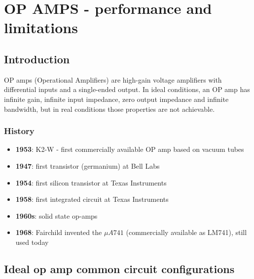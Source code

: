 \section{OP AMPS - performance and limitations}
\subsection{Introduction}
OP amps (Operational Amplifiers) are high-gain voltage amplifiers with differential inputs and a single-ended output. In ideal
conditions, an OP amp has infinite gain, infinite input impedance, zero output impedance and infinite bandwidth, but in real
conditions those properties are not achievable.

\subsubsection*{History}
\begin{itemize}
	\item \textbf{1953}: K2-W - first commercially available OP amp based on vacuum tubes
	\item \textbf{1947}: first transistor (germanium) at Bell Labs
	\item \textbf{1954}: first silicon transistor at Texas Instruments
	\item \textbf{1958}: first integrated circuit at Texas Instruments
	\item \textbf{1960s}: solid state op-amps
	\item \textbf{1968}: Fairchild invented the \(\mu{A741}\) (commercially available as LM741), still used today
\end{itemize}

\subsection{Ideal op amp common circuit configurations}
